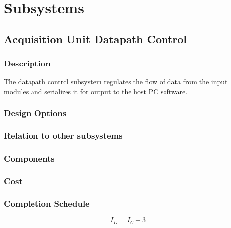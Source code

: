 
\chapter{Subsystems}
%

\section{Acquisition Unit Datapath Control}
\subsection{Description}
The datapath control subsystem regulates the flow of data from the input modules and serializes it for output to the host PC software. 

\subsection{Design Options}


\subsection{Relation to other subsystems}

\subsection{Components}

\subsection{Cost}

\subsection{Completion Schedule}
\begin{equation}
I_D = I_C + 3
\end{equation}



